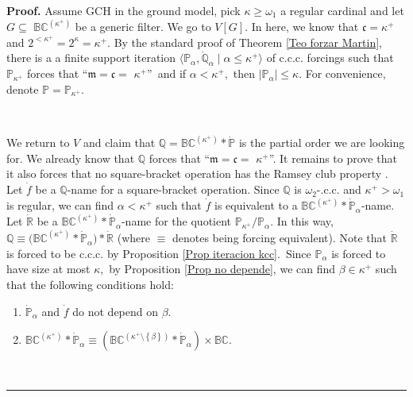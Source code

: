 \documentclass{article}
\newenvironment{proof}[1][Proof]{\noindent\textbf{#1.} }{\ \rule{0.5em}{0.5em}}
\begin{document}
\begin{proof}
Assume \textsf{GCH }in the ground model, pick $\kappa\geq\omega_{1}$ a regular
cardinal and let $G\subseteq$ $\mathbb{BC}^{(\kappa^{+})}$ be a generic
filter. We go to $V\left[  G\right]  .$ In here, we know that
$\mathfrak{c=\kappa}^{+}$ and $2^{<\kappa^{+}}=2^{\kappa}=\kappa^{+}.$ By the
standard proof of Theorem \ref{Teo forzar Martin}, there is a a finite support
iteration $\langle\mathbb{P}_{\alpha},\mathbb{\dot{Q}}_{\alpha}\mid\alpha
\leq\kappa^{+}\rangle$ of \textsf{c.c.c. }forcings such that $\mathbb{P}%
_{\kappa^{+}}$ forces that \textquotedblleft$\mathfrak{m=c=}$ $\kappa^{+}%
$\textquotedblright\ and if $\alpha<\kappa^{+},$ then $\left\vert
\mathbb{P}_{\alpha}\right\vert \leq\kappa.$ For convenience, denote
$\mathbb{P=P}_{\kappa^{+}}.$

\qquad\qquad\qquad\ \ 

We return to $V$ and claim that $\mathbb{Q=BC}^{(\kappa^{+})}\ast
\mathbb{\dot{P}}$ is the partial order we are looking for. We already know
that $\mathbb{Q}$ forces that \textquotedblleft$\mathfrak{m=c=}$ $\kappa^{+}%
$\textquotedblright. It remains to prove that it also forces that no
square-bracket operation has the Ramsey club property . Let $\dot{f}$ be a
$\mathbb{Q}$-name for a square-bracket operation. Since $\mathbb{Q}$ is
$\omega_{2}$-\textsf{.c.c. }and $\kappa^{+}>\omega_{1}$ is regular, we can
find $\alpha<\kappa^{+}$ such that $\dot{f}$ is equivalent to a $\mathbb{BC}%
^{(\kappa^{+})}\ast\mathbb{\dot{P}}_{\alpha}$-name. Let $\mathbb{\dot{R}}$ be
a $\mathbb{BC}^{(\kappa^{+})}\ast\mathbb{\dot{P}}_{\alpha}$-name for the
quotient $\mathbb{P}_{\kappa^{+}}/\mathbb{P}_{\alpha}.$ In this way,
$\mathbb{Q\equiv(BC}^{(\kappa^{+})}\ast\mathbb{\dot{P}}_{\alpha}%
)\ast\mathbb{\dot{R}}$ (where $\mathbb{\equiv}$ denotes being forcing
equivalent). Note that $\mathbb{\dot{R}}$ is forced to be \textsf{c.c.c.} by
Proposition \ref{Prop iteracion kcc}.\ Since $\mathbb{P}_{\alpha}$ is forced
to have size at most $\kappa,$ by Proposition \ref{Prop no depende}, we can
find $\beta\in\kappa^{+}$ such that the following conditions hold:

\begin{enumerate}
\item $\mathbb{\dot{P}}_{\alpha}$ and $\dot{f}$ do not depend on $\beta.$

\item $\mathbb{BC}^{\left(  \kappa^{+}\right)  }\ast\mathbb{\dot{P}}_{\alpha
}\equiv(\mathbb{BC}^{(\kappa^{+}\setminus\left\{  \beta\right\}  )}%
\ast\mathbb{\dot{P}}_{\alpha})\times\mathbb{BC}$.
\end{enumerate}


\end{proof}
\end{document}
